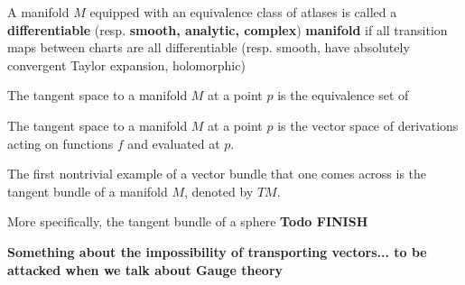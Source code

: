 	\begin{defn}
		A manifold $M$ equipped with an equivalence class of atlases is called a \textbf{differentiable} (resp. \textbf{smooth, analytic, complex}) \textbf{manifold} if all transition maps between charts are all differentiable (resp. smooth, have absolutely convergent Taylor expansion, holomorphic)
	\end{defn}
	
	\begin{defn}
		The tangent space to a manifold $M$ at a point $p$ is the equivalence set of 
	\end{defn}
	\begin{defn}
		The tangent space to a manifold $M$ at a point $p$ is the vector space of derivations acting on functions $f$ and evaluated at $p$.
	\end{defn}
	
	
	\begin{defn}
		
	\end{defn}
	
	\begin{defn}[Section]
		
	\end{defn}
	
	\begin{eg}
		
	\end{eg}
	
	\begin{eg}
		The first nontrivial example of a vector bundle that one comes across is the tangent bundle of a manifold $M$, denoted by $TM$.
		
		More specifically, the tangent bundle of a sphere \textbf{Todo FINISH}
	\end{eg}
	
	\begin{obs}
		
	\end{obs}
	
	\textbf{Something about the impossibility of transporting vectors... to be attacked when we talk about Gauge theory}
	
	\begin{defn}
		
	\end{defn}
	
